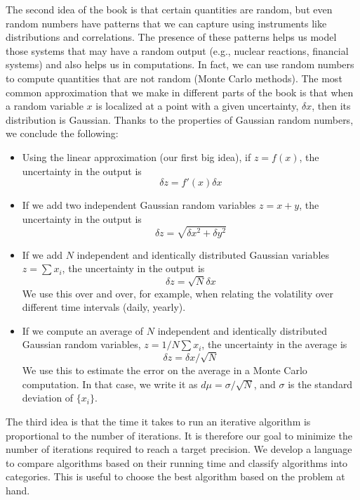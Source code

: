\documentclass[justified, sixbynine]{tufte-book}
\theoremstyle{plain}%
\newtheorem * {corollary}{Corollary}
\theoremstyle{definition}
\theoremstyle{remark}
\newtheorem * {remark}{Remark}
\newtheorem * {note}{Note}
\begin{document}
\begin{fullwidth}
The second idea of the book is that certain quantities are random, but even random numbers have patterns that we can capture using instruments like distributions and correlations. The presence of these patterns helps us model those systems that may have a random output (e.g., nuclear reactions, financial systems) and also helps us in computations. In fact, we can use random numbers to compute quantities that are not random (Monte Carlo methods). The most common approximation that we make in different parts of the book is that when a random variable $x$ is localized at a point with a given uncertainty, $\delta x$, then its distribution is Gaussian. Thanks to the properties of Gaussian random numbers, we conclude the following:
\begin{itemize}
\item Using the linear approximation (our first big idea), if $z=f(x)$, the uncertainty in the output is
\begin{equation}
\delta z = f'(x) \delta x
\end{equation}
\item If we add two independent Gaussian random variables $z=x+y$, the uncertainty in the output is
\begin{equation}
\delta z = \sqrt{\delta x^2 + \delta y^2}
\end{equation}
\item If we add $N$ independent and identically distributed Gaussian variables $z=\sum x_i$, the uncertainty in the output is
\begin{equation}
\delta z = \sqrt{N}\delta x
\end{equation}
We use this over and over, for example, when relating the volatility over different time intervals (daily, yearly).
\item If we compute an average of $N$ independent and identically distributed Gaussian random variables, $z=1/N \sum x_i$, the uncertainty in the average is
\begin{equation}
\delta z = \delta x/\sqrt{N}
\end{equation}
We use this to estimate the error on the average in a Monte Carlo computation. In that case, we write it as $d\mu = \sigma/\sqrt{N}$, and $\sigma$ is the standard deviation of $\{ x_i\}$.
\end{itemize}

The third idea is that the time it takes to run an iterative algorithm is proportional to the number of iterations. It is therefore our goal to minimize the number of iterations required to reach a target precision. We develop a language to compare algorithms based on their running time and classify algorithms into categories. This is useful to choose the best algorithm based on the problem at hand.


\end{fullwidth}
\end{document}
